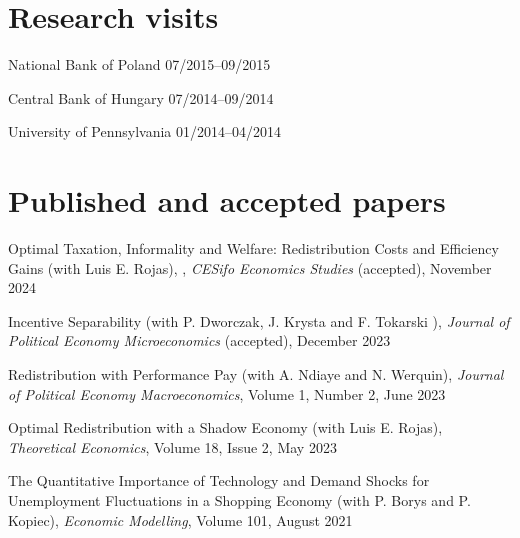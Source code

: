 \documentclass[letterpaper]{article}
\renewenvironment{itemize}{
  \begin{list}{}{
    \setlength{\leftmargin}{1.5em}
  }
}{
  \end{list}
}
\begin{document}
\section*{Research visits}

\begin{itemize}
  \item National Bank of Poland \hfill  07/2015--09/2015
  \item Central Bank of Hungary \hfill  07/2014--09/2014
  \item University of Pennsylvania \hfill  01/2014--04/2014
\end{itemize}


  



\section*{Published and accepted papers}

\begin{itemize}
\item Optimal Taxation, Informality and Welfare: Redistribution Costs and Efficiency Gains (with Luis E. Rojas), , \textit{CESifo Economics Studies} (accepted), November 2024
\item Incentive Separability (with P. Dworczak, J. Krysta and F. Tokarski ), \textit{Journal of Political Economy Microeconomics} (accepted), December 2023
\item Redistribution with Performance Pay (with A. Ndiaye and N. Werquin), \textit{Journal of Political Economy Macroeconomics}, Volume 1, Number 2, June 2023
\item Optimal Redistribution with a Shadow Economy (with Luis E. Rojas), \textit{Theoretical Economics}, Volume 18, Issue 2, May 2023
\item The Quantitative Importance of Technology and Demand Shocks for Unemployment Fluctuations in a Shopping Economy (with P. Borys and P. Kopiec), \textit{Economic Modelling}, Volume 101, August 2021
\end{itemize}
\end{document}
